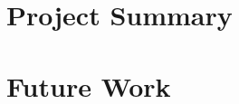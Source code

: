 \documentclass{l4proj}
\begin{document}
\section{Project Summary}
\section{Future Work}
\begin{appendices}

\end{appendices}



\end{document}
